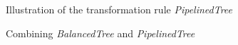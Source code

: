 \begin{figure}[htbp]
  \centering
  \scalebox{0.7}{\mbox{}}
  \caption{Illustration of the transformation rule \textit{PipelinedTree}}
  \label{fig:pipelined-tree}
\end{figure}

\begin{figure}[htbp]
  \centering
  \scalebox{0.7}{\mbox{}}
  \caption{Combining \textit{BalancedTree} and \textit{PipelinedTree}}
  \label{fig:balanced-pipelined-tree}
\end{figure}


